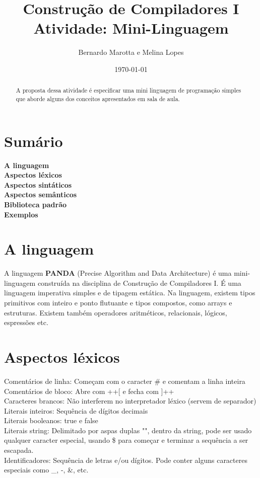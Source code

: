 \documentclass[letterpaper,12pt]{article}
\begin{document}
\title{%
  Constru\c{c}\~ao de Compiladores I\\
  \large Atividade: Mini-Linguagem}
\author{Bernardo Marotta e Melina Lopes}
\date{\today}
\maketitle

\begin{abstract}
A proposta dessa atividade \'e especificar uma mini linguagem de programa\c{c}\~ao simples que aborde alguns dos conceitos apresentados em sala de aula. 
\end{abstract}


\section{Sum\'ario}
\textbf{A linguagem}\\
\textbf{Aspectos l\'exicos}\\
\textbf{Aspectos sint\'aticos}\\
\textbf{Aspectos sem\^anticos}\\
\textbf{Biblioteca padr\~ao}\\
\textbf{Exemplos}\\


\section{A linguagem}
A linguagem \textbf{PANDA} (Precise Algorithm and Data Architecture) \'e uma mini-linguagem constru\'ida na disciplina de Constru\c{c}\~ao de Compiladores I. \'E uma linguagem imperativa simples e de tipagem est\'atica. Na linguagem, existem tipos primitivos com inteiro e ponto flutuante e tipos compostos, como arrays e estruturas. Existem tamb\'em operadores aritm\'eticos, relacionais, l\'ogicos, espressões etc.

\section{Aspectos l\'exicos}
Coment\'arios de linha: Come\c{c}am com o caracter \# e comentam a linha inteira\\
Coment\'arios de bloco: Abre com ++[ e fecha com ]++\\
Caracteres brancos: N\~ao interferem no interpretador l\'exico (servem de separador)\\
Literais inteiros: Sequ\^encia de d\'igitos decimais\\
Literais booleanos: true e false\\	
Literais string: Delimitado por aspas duplas "", dentro da string, pode ser usado qualquer caracter especial, usando \$ para come\c{c}ar e terminar a sequ\^encia a ser escapada.\\
Identificadores: Sequ\^encia de letras e/ou d\'igitos. Pode conter alguns caracteres especiais como \_, -, \&, etc. 
\end{document}
